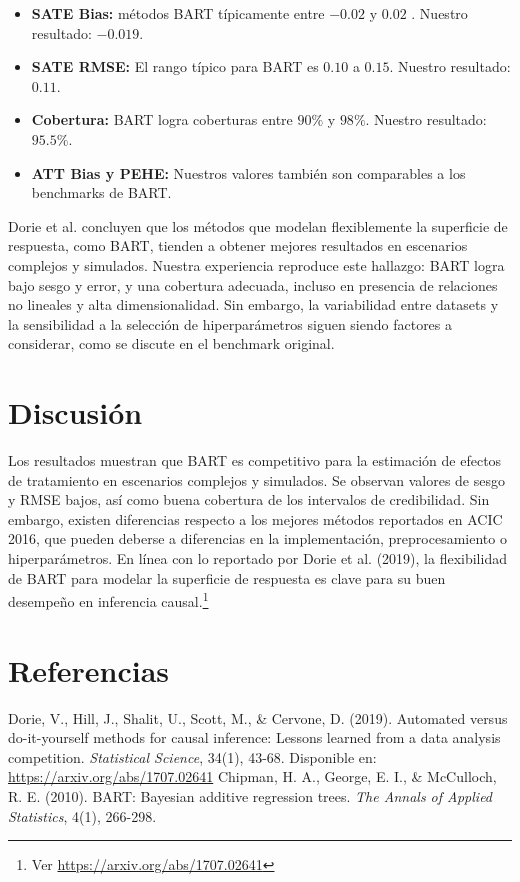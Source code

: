 \documentclass[a4paper,12pt]{article}
\begin{document}
\begin{itemize}
    \item \textbf{SATE Bias:} métodos BART típicamente entre $-0.02$ y $0.02$ \cite{dorie2019automated}. Nuestro resultado: $-0.019$.
    \item \textbf{SATE RMSE:} El rango típico para BART es $0.10$ a $0.15$. Nuestro resultado: $0.11$.
    \item \textbf{Cobertura:} BART logra coberturas entre $90\%$ y $98\%$. Nuestro resultado: $95.5\%$.
    \item \textbf{ATT Bias y PEHE:} Nuestros valores también son comparables a los benchmarks de BART.
\end{itemize}

Dorie et al. concluyen que los métodos que modelan flexiblemente la superficie de respuesta, como BART, tienden a obtener mejores resultados en escenarios complejos y simulados. Nuestra experiencia reproduce este hallazgo: BART logra bajo sesgo y error, y una cobertura adecuada, incluso en presencia de relaciones no lineales y alta dimensionalidad. Sin embargo, la variabilidad entre datasets y la sensibilidad a la selección de hiperparámetros siguen siendo factores a considerar, como se discute en el benchmark original.

\section{Discusión}
Los resultados muestran que BART es competitivo para la estimación de efectos de tratamiento en escenarios complejos y simulados. Se observan valores de sesgo y RMSE bajos, así como buena cobertura de los intervalos de credibilidad. Sin embargo, existen diferencias respecto a los mejores métodos reportados en ACIC 2016, que pueden deberse a diferencias en la implementación, preprocesamiento o hiperparámetros. En línea con lo reportado por Dorie et al. (2019), la flexibilidad de BART para modelar la superficie de respuesta es clave para su buen desempeño en inferencia causal.\footnote{Ver \url{https://arxiv.org/abs/1707.02641}}

\section{Referencias}
\begin{thebibliography}{9}
 Dorie, V., Hill, J., Shalit, U., Scott, M., \& Cervone, D. (2019). Automated versus do-it-yourself methods for causal inference: Lessons learned from a data analysis competition. \textit{Statistical Science}, 34(1), 43-68. Disponible en: \url{https://arxiv.org/abs/1707.02641}
 Chipman, H. A., George, E. I., \& McCulloch, R. E. (2010). BART: Bayesian additive regression trees. \textit{The Annals of Applied Statistics}, 4(1), 266-298.
\end{thebibliography}
\end{document}
